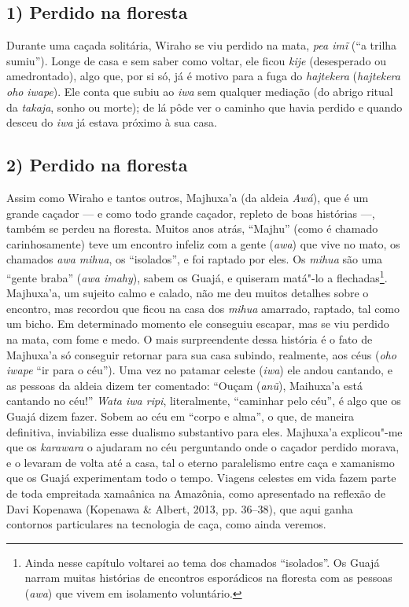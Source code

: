 \subsection{1) Perdido na floresta}

\forceindent Durante uma caçada solitária, Wiraho se viu perdido na mata, \emph{pea
imĩ} (``a trilha sumiu''). Longe de casa e sem saber como voltar, ele
ficou \emph{kije} (desesperado ou amedrontado), algo que, por si só, já
é motivo para a fuga do \emph{hajtekera} (\emph{hajtekera oho}
\emph{iwape}). Ele conta que subiu ao \emph{iwa} sem qualquer mediação
(do abrigo ritual da \emph{takaja}, sonho ou morte); de lá pôde ver o
caminho que havia perdido e quando desceu do \emph{iwa} já estava
próximo à sua casa.

\subsection{2) Perdido na floresta}

\forceindent Assim como Wiraho e tantos outros, Majhuxa'a (da aldeia \emph{Awá}), que
é um grande caçador --- e como todo grande caçador, repleto de boas
histórias ---, também se perdeu na floresta. Muitos anos atrás, ``Majhu''
(como é chamado carinhosamente) teve um encontro infeliz com a gente
(\emph{awa}) que vive no mato, os chamados \emph{awa mihua}, os
``isolados'', e foi raptado por eles. Os \emph{mihua} são uma ``gente
braba'' (\emph{awa imahy}), sabem os Guajá, e quiseram matá"-lo a
flechadas\footnote{Ainda nesse capítulo voltarei ao tema dos chamados
  ``isolados''. Os Guajá narram muitas histórias de encontros esporádicos
  na floresta com as pessoas (\emph{awa}) que vivem em isolamento
  voluntário.}. Majhuxa'a, um sujeito calmo e calado, não me deu muitos
detalhes sobre o encontro, mas recordou que ficou na casa dos
\emph{mihua} amarrado, raptado, tal como um bicho. Em determinado
momento ele conseguiu escapar, mas se viu perdido na mata, com fome e
medo. O mais surpreendente dessa história é o fato de Majhuxa'a só
conseguir retornar para sua casa subindo, realmente, aos céus (\emph{oho
iwape} ``ir para o céu''). Uma vez no patamar celeste (\emph{iwa}) ele
andou cantando, e as pessoas da aldeia dizem ter comentado: ``Ouçam
(\emph{anũ}), Maihuxa'a está cantando no céu!'' \emph{Wata iwa ripi},
literalmente, ``caminhar pelo céu'', é algo que os Guajá dizem fazer.
Sobem ao céu em ``corpo e alma'', o que, de maneira definitiva,
inviabiliza esse dualismo substantivo para eles. Majhuxa'a explicou"-me
que os \emph{karawara} o ajudaram no céu perguntando onde o caçador
perdido morava, e o levaram de volta até a casa, tal o eterno
paralelismo entre caça e xamanismo que os Guajá experimentam todo o
tempo. Viagens celestes em vida fazem parte de toda empreitada xamaânica
na Amazônia, como apresentado na reflexão de Davi Kopenawa (Kopenawa \&
Albert, 2013, pp. 36--38), que aqui ganha contornos particulares na
tecnologia de caça, como ainda veremos.

